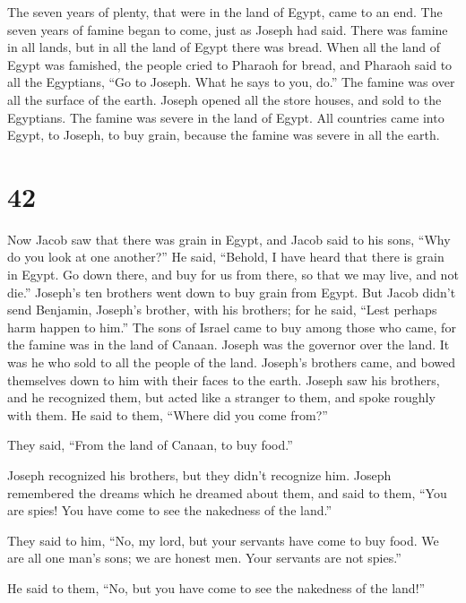  The seven years of plenty, that were in the land of Egypt,
came to an end.  The seven years of famine began to come,
just as Joseph had said. There was famine in all lands, but in all the
land of Egypt there was bread.  When all the land of Egypt
was famished, the people cried to Pharaoh for bread, and Pharaoh said to
all the Egyptians, ``Go to Joseph. What he says to you, do.''
 The famine was over all the surface of the earth. Joseph
opened all the store houses, and sold to the Egyptians. The famine was
severe in the land of Egypt.  All countries came into
Egypt, to Joseph, to buy grain, because the famine was severe in all the
earth.

\hypertarget{section-41}{%
\section{42}\label{section-41}}

 Now Jacob saw that there was grain in Egypt, and Jacob said
to his sons, ``Why do you look at one another?''  He said,
``Behold, I have heard that there is grain in Egypt. Go down there, and
buy for us from there, so that we may live, and not die.'' 
Joseph's ten brothers went down to buy grain from Egypt. 
But Jacob didn't send Benjamin, Joseph's brother, with his brothers; for
he said, ``Lest perhaps harm happen to him.''  The sons of
Israel came to buy among those who came, for the famine was in the land
of Canaan.  Joseph was the governor over the land. It was he
who sold to all the people of the land. Joseph's brothers came, and
bowed themselves down to him with their faces to the earth. 
Joseph saw his brothers, and he recognized them, but acted like a
stranger to them, and spoke roughly with them. He said to them, ``Where
did you come from?''

They said, ``From the land of Canaan, to buy food.''

 Joseph recognized his brothers, but they didn't recognize
him.  Joseph remembered the dreams which he dreamed about
them, and said to them, ``You are spies! You have come to see the
nakedness of the land.''

 They said to him, ``No, my lord, but your servants have
come to buy food.  We are all one man's sons; we are honest
men. Your servants are not spies.''

 He said to them, ``No, but you have come to see the
nakedness of the land!''

